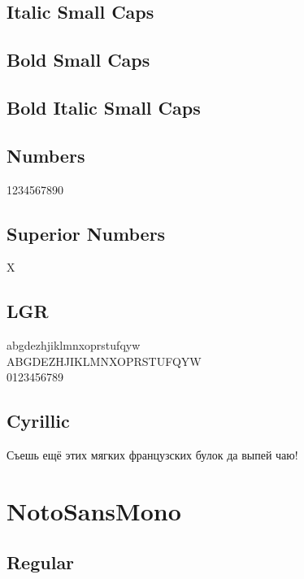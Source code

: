 \documentclass{article}
\begin{document}
\subsection*{Italic Small Caps}
\textsc{\textit{\lipsum[2]}}

\subsection*{Bold Small Caps}

\textsc{\textbf{\lipsum[3]}}



\subsection*{Bold Italic Small Caps}
\textsc{\textbf{\textit{\lipsum[4]}}}

\subsection*{Numbers}

1234567890

\subsection*{Superior Numbers}

X


\subsection*{LGR}

{\notosanslgr\noindent
abgdezhjiklmnxoprstufqyw\\
ABGDEZHJIKLMNXOPRSTUFQYW\\
0123456789
}

\subsection*{Cyrillic}

{\ifxetex\else\ifluatex\else{}\selectfont\fi\fi
Съешь ещё этих мягких французских булок да
выпей чаю!}

\section*{NotoSansMono}

\ttfamily

\subsection*{Regular}
\lipsum[1]
\end{document}
